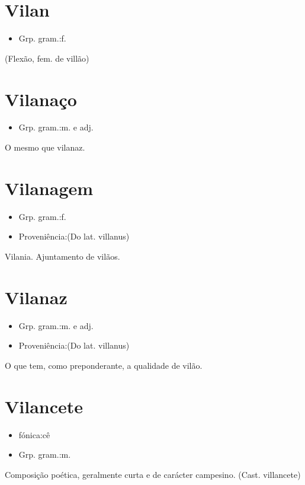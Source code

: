 \documentclass{article}
\begin{document}
\section{Vilan}
\begin{itemize}
\item {Grp. gram.:f.}
\end{itemize}
(Flexão, fem. de \textunderscore villão\textunderscore )
\section{Vilanaço}
\begin{itemize}
\item {Grp. gram.:m.  e  adj.}
\end{itemize}
O mesmo que \textunderscore vilanaz\textunderscore .
\section{Vilanagem}
\begin{itemize}
\item {Grp. gram.:f.}
\end{itemize}
\begin{itemize}
\item {Proveniência:(Do lat. \textunderscore villanus\textunderscore )}
\end{itemize}
Vilania.
Ajuntamento de vilãos.
\section{Vilanaz}
\begin{itemize}
\item {Grp. gram.:m.  e  adj.}
\end{itemize}
\begin{itemize}
\item {Proveniência:(Do lat. \textunderscore villanus\textunderscore )}
\end{itemize}
O que tem, como preponderante, a qualidade de vilão.
\section{Vilancete}
\begin{itemize}
\item {fónica:cê}
\end{itemize}
\begin{itemize}
\item {Grp. gram.:m.}
\end{itemize}
Composição poética, geralmente curta e de carácter campesino.
(Cast. \textunderscore villancete\textunderscore )
\end{document}
